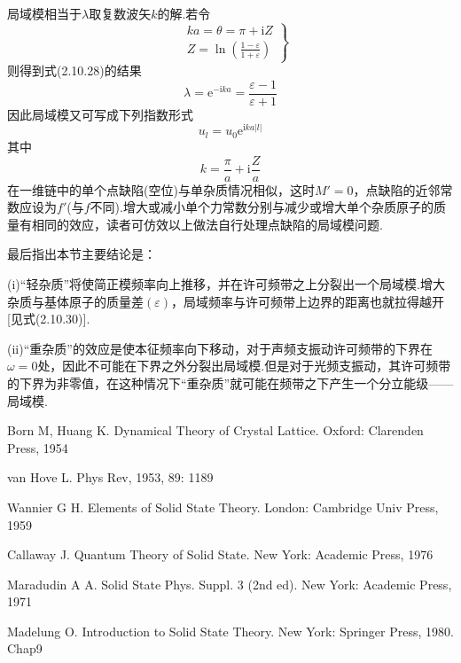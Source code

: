 局域模相当于$\lambda$取复数波矢$k$的解.若令
\begin{equation}
\left.\begin{aligned}
  &ka=\theta=\pi+\mathrm{i}Z\\
  &Z=\ln\left(\frac{1-\varepsilon}{1+\varepsilon}\right)
\end{aligned}\right\}
\end{equation}
则得到式(2.10.28)的结果
\begin{equation}
  \lambda=\mathrm{e}^{-\mathrm{i}ka}=\frac{\varepsilon-1}{\varepsilon+1}
\end{equation}
因此局域模又可写成下列指数形式
\begin{equation}
  u_l=u_0\mathrm{e}^{\mathrm{i}ka|l|}
\end{equation}
其中
\begin{equation}
  k=\frac{\pi}{a}+\mathrm{i}\frac{Z}{a}
\end{equation}
在一维链中的单个点缺陷(空位)与单杂质情况相似，这时$M'=0$，点缺陷的近邻常数应设为$f'$(与$f$不同).增大或减小单个力常数分别与减少或增大单个杂质原子的质量有相同的效应，读者可仿效以上做法自行处理点缺陷的局域模问题.

最后指出本节主要结论是：

(i)“轻杂质”将使简正模频率向上推移，并在许可频带之上分裂出一个局域模.增大杂质与基体原子的质量差$(\varepsilon)$，局域频率与许可频带上边界的距离也就拉得越开[见式(2.10.30)].

(ii)“重杂质”的效应是使本征频率向下移动，对于声频支振动许可频带的下界在$\omega=0$处，因此不可能在下界之外分裂出局域模.但是对于光频支振动，其许可频带的下界为非零值，在这种情况下“重杂质”就可能在频带之下产生一个分立能级——局域模.

\begin{canKao}
\begin{enumerate}[label={[\arabic*]}, leftmargin=2.2em, itemsep=0pt]
\item Born M, Huang K. Dynamical Theory of Crystal Lattice. Oxford: Clarenden Press, 1954
\item van Hove L. Phys Rev, 1953, 89: 1189
\item Wannier G H. Elements of Solid State Theory. London: Cambridge Univ Press, 1959
\item Callaway J. Quantum Theory of Solid State. New York: Academic Press, 1976
\item Maradudin A A. Solid State Phys. Suppl. 3 (2nd ed). New York: Academic Press, 1971
\item Madelung O. Introduction to Solid State Theory. New York: Springer Press, 1980. Chap9
\end{enumerate}
\end{canKao}
